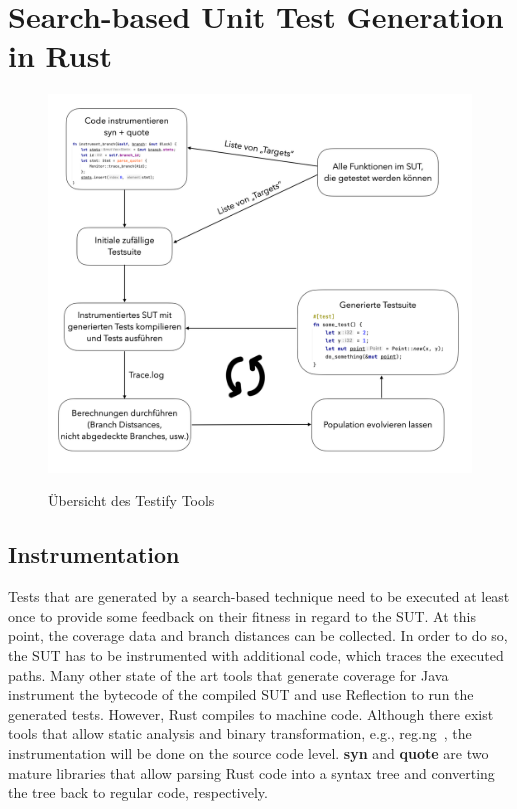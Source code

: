\documentclass{article}
\begin{document}
\section{Search-based Unit Test Generation in Rust}
\begin{figure}[h]
\caption{Übersicht des Testify Tools}
\centering
\includegraphics[width=\textwidth]{testify-overview}
\label{fig:testify-overview}
\end{figure}
\subsection{Instrumentation}
Tests that are generated by a search-based technique need to be executed at least once to provide some feedback on their fitness in regard to the \ac{SUT}. At this point, the coverage data and branch distances can be collected. In order to do so, the \ac{SUT} has to be instrumented with additional code, which traces the executed paths. Many other state of the art tools that generate coverage for Java instrument the bytecode of the compiled \ac{SUT} and use Reflection to run the generated tests. However, Rust compiles to machine code. Although there exist tools that allow static analysis and binary transformation, e.g., reg.ng~\cite{DiFederico2018}, the instrumentation will be done on the source code level. \textbf{syn} and \textbf{quote} are two mature libraries that allow parsing Rust code into a syntax tree and converting the tree back to regular code, respectively. 
\end{document}
